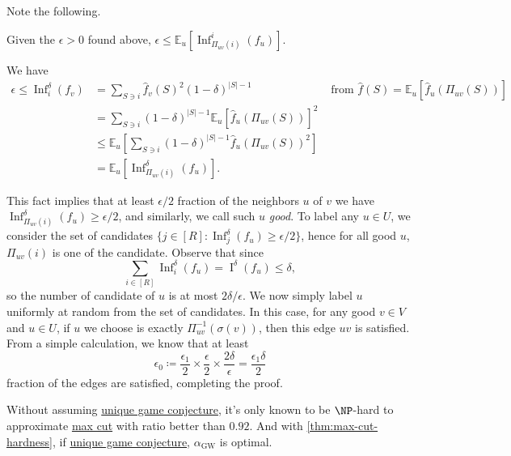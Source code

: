 Note the following.
\begin{remark}[Fact]
	Given the \(\epsilon > 0\) found above, \(\epsilon \leq \mathbb{E}_{u}\left[\mathop{\mathrm{Inf}}\nolimits_{\Pi _{uv}(i)}^i (f_u) \right]\).
\end{remark}
\begin{explanation}
	We have
	\[
		\begin{aligned}
			\epsilon
			\leq \mathop{\mathrm{Inf}}\nolimits_i^\delta (f_v)
			 & = \sum_{S \ni i} \hat{f} _v(S)^2(1-\delta )^{\vert S \vert - 1}                                            & \text{ from } \hat{f} (S) = \mathbb{E}_{u}\left[\hat{f} _u(\Pi _{uv}(S)) \right] \\
			 & = \sum_{S \ni i} (1-\delta )^{\vert S \vert - 1}\mathbb{E}_{u}\left[\hat{f} _u(\Pi _{uv}(S)) \right] ^2                                                                                       \\
			 & \leq \mathbb{E}_{u}\left[\sum_{S \ni i} (1-\delta )^{\vert S \vert - 1} \hat{f} _u(\Pi _{uv}(S))^2 \right]                                                                                    \\
			 & = \mathbb{E}_{u}\left[\mathop{\mathrm{Inf}}\nolimits_{\Pi _{uv}(i)}^\delta (f_u) \right].
		\end{aligned}
	\]
\end{explanation}

This fact implies that at least \(\epsilon / 2\) fraction of the neighbors \(u\) of \(v\) we have \(\mathop{\mathrm{Inf}}_{\Pi _{uv}(i)}^\delta  (f_u) \geq \epsilon / 2\), and similarly, we call such \(u\) \emph{good}. To label any \(u\in U\), we consider the set of candidates \(\{ j\in [R]\colon \mathop{\mathrm{Inf}}_{j}^\delta (f_u) \geq \epsilon /2 \} \), hence for all good \(u\), \(\Pi _{uv}(i)\) is one of the candidate. Observe that since
\[
	\sum_{i\in [R]} \mathop{\mathrm{Inf}}\nolimits_{i}^\delta (f_u) = \mathop{\mathrm{I}}\nolimits^{\delta }(f_u) \leq \delta,
\]
so the number of candidate of \(u\) is at most \(2\delta / \epsilon \). We now simply label \(u\) uniformly at random from the set of candidates. In this case, for any good \(v\in V\) and \(u\in U\), if \(u\) we choose is exactly \(\Pi_{uv}^{-1} (\sigma (v)) \), then this edge \(uv\) is satisfied. From a simple calculation, we know that at least
\[
	\epsilon _0 \coloneqq \frac{\epsilon _1}{2}\times \frac{\epsilon }{2} \times \frac{2\delta }{\epsilon } = \frac{\epsilon _1 \delta }{2}
\]
fraction of the edges are satisfied, completing the proof.

\begin{remark}
	Without assuming \hyperref[conj:unique-game]{unique game conjecture}, it's only known to be \(\NP\)-hard to approximate \hyperref[prb:max-cut]{max cut} with ratio better than \(0.92\). And with \autoref{thm:max-cut-hardness}, if \hyperref[conj:unique-game]{unique game conjecture}, \(\alpha _{\mathrm{GW} }\) is optimal.
\end{remark}